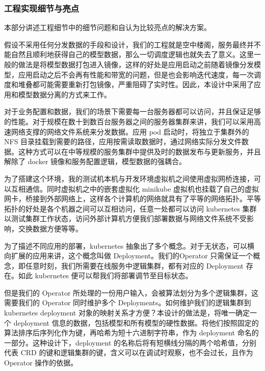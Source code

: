 \subsubsection{工程实现细节与亮点}

本部分讲述工程细节中的细节问题和自认为比较亮点的解决方案。


假设不采用任何分发数据的手段和设计，我们的工程就是空中楼阁，服务最终并不能自然且顺利地获得自己的模型数据，那么一切调度逻辑也就失去了意义。这里一般的做法是将模型数据打包进入镜像，这样的好处是应用启动之前随着镜像分发模型，应用启动之后不会再有性能和带宽的问题，但是也会影响迭代速度，每一次调度和堆叠都可能需要重新打包镜像，严重阻碍了实时性。因此，本设计中采用了应用和模型数据分离的方式来工作。

对于业务配置和数据，我们的场景下需要每一台服务器都可以访问，并且保证足够的性能。对于规模在数十到数百台服务器之间的服务器集群来讲，我们可以采用高速网络支撑的网络文件系统来分发数据。应用 pod 启动时，将独立于集群外的 NFS 目录挂载到需要的路径，应用按需读取数据时，通过网络实际分发文件数据。这种方式可以在中等规模的服务集群中提供及时的数据发布与更新服务，并且解除了 docker 镜像和服务配置逻辑，模型数据的强耦合。


为了搭建这个环境，我的测试机本机与开发环境虚拟机之间使用虚拟网桥连接，可以互相通信。同时虚拟机之中的嵌套虚拟化 minikube 虚拟机也挂载了自己的虚拟网卡，桥接到外部网络上，这样各个计算机的网络就具有了平等的网络拓扑。平等拓扑的好处是各个机器之间可以互相访问，任意一处都可以访问 kubernetes 集群以测试集群工作状态，访问外部计算机方便我们部署数据与网络文件系统不受影响，交换数据方便等等。


为了描述不同应用的部署，kubernetes 抽象出了多个概念。对于无状态，可以横向扩展的应用来讲，这个概念叫做 Deployment。我们的Operator 只需保证一个概念，即任意时刻，我们所需要在线服务中逻辑集群，都有对应的 Deployment 存在。如此 kubernetes 便可以帮我们将部署调节至目标状态。

但是我们的 Operator 所处理的一份用户输入，会被算法划分为多个逻辑集群，这需要我们的 Operator 同时维护多个 Deployments。如何维护我们的逻辑集群到 kubernetes deployment 对象的映射关系才方便？本设计的做法是，将唯一确定一个 deployment 信息的数据，包括模型和所有模型的硬性数据。将他们按照固定的算法排序后序列化作为键，再哈希为短十六进制字符串，作为 deployment 命名的一部分。这种设计下，deployment 的名称后将有短横线分隔的两个哈希值，分别代表 CRD 的键和逻辑集群的键，含义可以在调试时观察，也不会过长，且作为 Operator 操作的依据。

